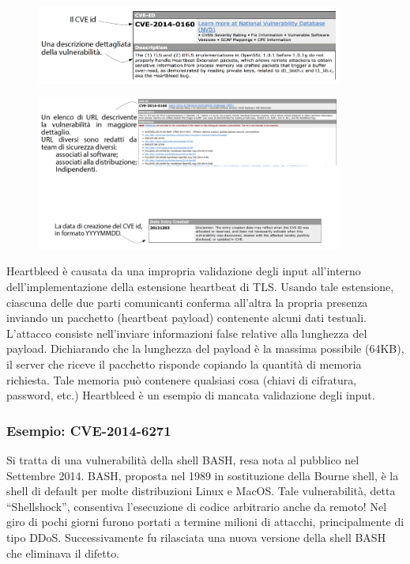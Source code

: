 \begin{figure}[hbpt!]
    \centering
    \includegraphics[width=0.9\textwidth]{./Images/cap2/2.2.png}
\end{figure}
\FloatBarrier

\begin{figure}[hbpt!]
    \centering
    \includegraphics[width=0.9\textwidth]{./Images/cap2/2.3.png}
\end{figure}
\FloatBarrier
Heartbleed è causata da una impropria validazione degli
input all’interno dell’implementazione della estensione
heartbeat di TLS. Usando tale estensione, ciascuna delle due parti comunicanti
conferma all’altra la propria presenza inviando un pacchetto
(heartbeat payload) contenente alcuni dati testuali. L’attacco consiste nell’inviare informazioni false relative alla
lunghezza del payload. Dichiarando che la lunghezza del payload è la massima possibile
(64KB), il server che riceve il pacchetto risponde copiando la
quantità di memoria richiesta. Tale memoria può contenere qualsiasi cosa (chiavi di cifratura,
password, etc.)
Heartbleed è un esempio di mancata validazione degli input.

\subsubsection{Esempio: CVE-2014-6271}
Si tratta di una vulnerabilità della shell BASH,
resa nota al pubblico nel Settembre 2014. BASH, proposta nel 1989 in sostituzione della Bourne shell,
è la shell di default per molte distribuzioni Linux e MacOS. Tale vulnerabilità, detta “Shellshock”, consentiva
l’esecuzione di codice arbitrario anche da remoto! Nel giro di pochi giorni furono portati a termine milioni di
attacchi, principalmente di tipo DDoS. Successivamente fu rilasciata una nuova
versione della shell BASH che eliminava
il difetto.

